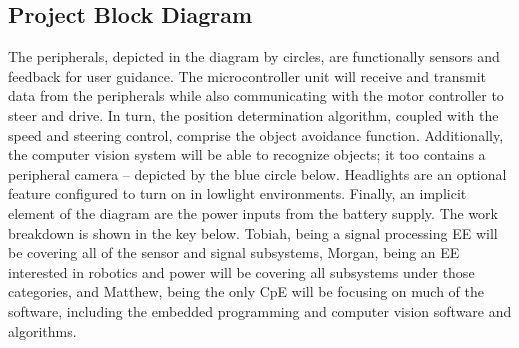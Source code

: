 \subsection{Project Block Diagram}

\indent The peripherals, depicted in the diagram by circles, are functionally sensors and feedback for user guidance. The microcontroller unit will receive and transmit data from the peripherals while also communicating with the motor controller to steer and drive. In turn, the position determination algorithm, coupled with the speed and steering control, comprise the object avoidance function. Additionally, the computer vision system will be able to recognize objects; it too contains a peripheral camera – depicted by the blue circle below. Headlights are an optional feature configured to turn on in lowlight environments. Finally, an implicit element of the diagram are the power inputs from the battery supply. The work breakdown is shown in the key below. Tobiah, being a signal processing EE will be covering all of the sensor and signal subsystems, Morgan, being an EE interested in robotics and power will be covering all subsystems under those categories, and Matthew, being the only CpE will be focusing on much of the software, including the embedded programming and computer vision software and algorithms. 